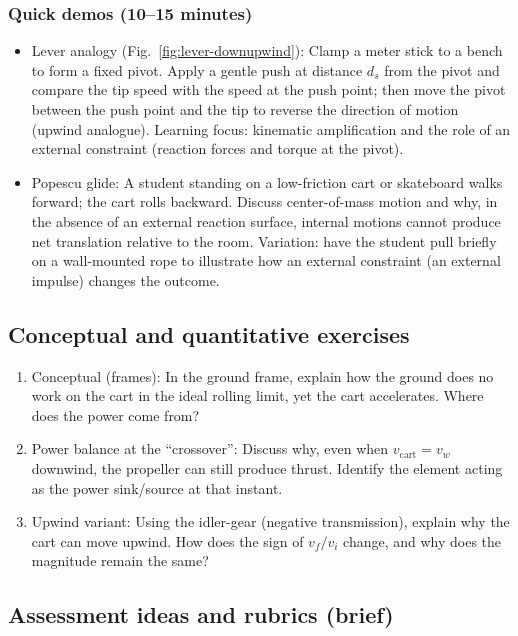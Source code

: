 \documentclass[reprint,aps,pra,longbibliography]{revtex4-2}
\begin{document}
\subsubsection{Quick demos (10--15 minutes)}
\begin{itemize}
\item Lever analogy (Fig.~\ref{fig:lever-downupwind}): Clamp a meter stick to a bench to form a fixed pivot. Apply a gentle push at distance $d_s$ from the pivot and compare the tip speed with the speed at the push point; then move the pivot between the push point and the tip to reverse the direction of motion (upwind analogue). Learning focus: kinematic amplification and the role of an external constraint (reaction forces and torque at the pivot).
\item Popescu glide: A student standing on a low-friction cart or skateboard walks forward; the cart rolls backward. Discuss center-of-mass motion and why, in the absence of an external reaction surface, internal motions cannot produce net translation relative to the room. Variation: have the student pull briefly on a wall-mounted rope to illustrate how an external constraint (an external impulse) changes the outcome.
\end{itemize}


\subsection{Conceptual and quantitative exercises}

\begin{enumerate}
\item Conceptual (frames): In the ground frame, explain how the ground does no work on the cart in the ideal rolling limit, yet the cart accelerates. Where does the power come from?

\item Power balance at the ``crossover'': Discuss why, even when $v_\text{cart}=v_w$ downwind, the propeller can still produce thrust. Identify the element acting as the power sink/source at that instant.

\item Upwind variant: Using the idler-gear (negative transmission), explain why the cart can move upwind. How does the sign of $v_f/v_i$ change, and why does the magnitude remain the same?
\end{enumerate}

\subsection{Assessment ideas and rubrics (brief)}
\end{document}
